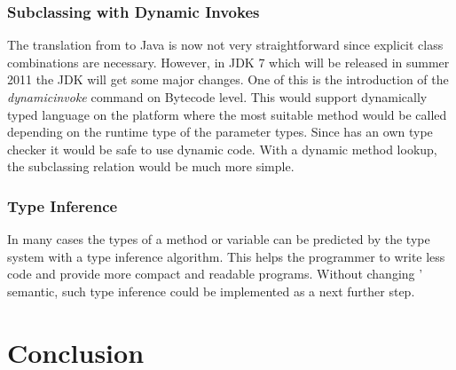\subsubsection{Subclassing with Dynamic Invokes}
The translation from \ooplss to Java is now not very straightforward since
explicit class combinations are necessary. However, in JDK 7 which will
be released in summer 2011 the JDK will get some major changes. One
of this is the introduction of the \emph{dynamicinvoke} command on
Bytecode level. This would support dynamically typed language on the
platform where the most suitable method would be called depending on the
runtime type of the parameter types. Since \ooplss has an own type
checker it would be safe to use dynamic code. With a dynamic method
lookup, the subclassing relation would be much more simple.

\subsubsection{Type Inference}
In many cases the types of a method or variable can be predicted
by the type system with a type inference algorithm. This helps
the programmer to write less code and provide more compact and readable
programs. Without changing \ooplss' semantic, such type inference
could be implemented as a next further step.

\section{Conclusion}
\label{ctr:conclusion}
